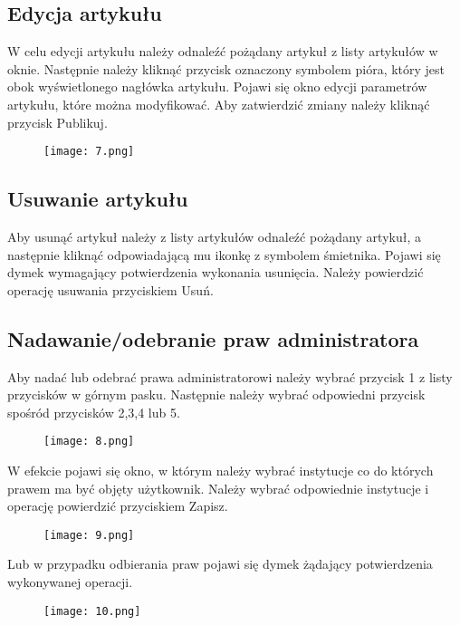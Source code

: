 \documentclass{article}
\begin{document}
\subsection{Edycja artykułu}
	W celu edycji artykułu należy odnaleźć pożądany artykuł z listy artykułów w oknie. Następnie należy kliknąć przycisk oznaczony symbolem pióra, który jest obok wyświetlonego nagłówka artykułu. Pojawi się okno edycji parametrów artykułu, które można modyfikować. Aby zatwierdzić zmiany należy kliknąć przycisk Publikuj.
\begin{figure}[h!]
	\texttt{[image: 7.png]}
	\centering
\end{figure}

\subsection{Usuwanie artykułu}
	Aby usunąć artykuł należy z listy artykułów odnaleźć pożądany artykuł, a następnie kliknąć odpowiadającą mu ikonkę z symbolem śmietnika. Pojawi się dymek wymagający potwierdzenia wykonania usunięcia. Należy powierdzić operację usuwania przyciskiem Usuń.

\subsection{Nadawanie/odebranie praw administratora}
	Aby nadać lub odebrać prawa administratorowi należy wybrać przycisk 1 z listy przycisków w górnym pasku. Następnie należy wybrać odpowiedni przycisk spośród przycisków 2,3,4 lub 5. 
\begin{figure}[h!]
	\texttt{[image: 8.png]}
	\centering
\end{figure}

	W efekcie pojawi się okno, w którym należy wybrać instytucje co do których prawem ma być objęty użytkownik. Należy wybrać odpowiednie instytucje i operację powierdzić przyciskiem Zapisz.

\begin{figure}[h!]
	\texttt{[image: 9.png]}
	\centering
\end{figure}	

\newpage		
	Lub w przypadku odbierania praw pojawi się dymek żądający potwierdzenia wykonywanej operacji.	

\begin{figure}[h!]
	\texttt{[image: 10.png]}
	\centering
\end{figure}
\end{document}
